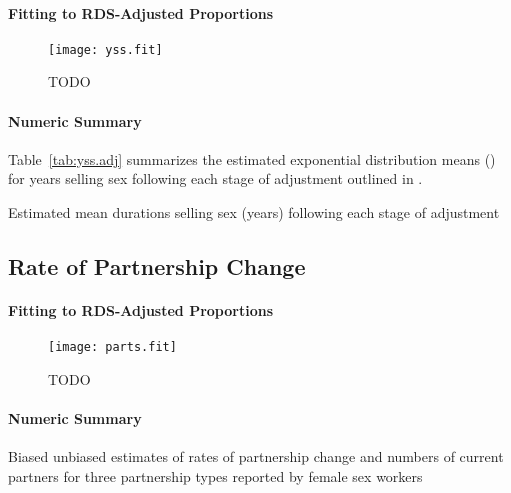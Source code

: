 \paragraph{Fitting to RDS-Adjusted Proportions}
\begin{figure}[h]
  \centering\texttt{[image: yss.fit]}
  \caption{TODO}
\end{figure}
\paragraph{Numeric Summary}
Table~\ref{tab:yss.adj} summarizes the estimated exponential distribution means (\ci)
for years selling sex following each stage of adjustment outlined in .
\begin{table}[h]
  \centering
  \caption{Estimated mean durations selling sex (years) following each stage of adjustment}
  
  \label{tab:yss.adj}
\end{table}
\subsection{Rate of Partnership Change}\label{app.parts}
\paragraph{Fitting to RDS-Adjusted Proportions}
\begin{figure}[h]
  \centering\texttt{[image: parts.fit]}
  \caption{TODO}
\end{figure}
\paragraph{Numeric Summary}
\begin{table}[h]
  \centering
  \caption{Biased \vs unbiased estimates of
    rates of partnership change and numbers of current partners
    for three partnership types reported by female sex workers}
  
  \label{tab:parts.fsw}
\end{table}
